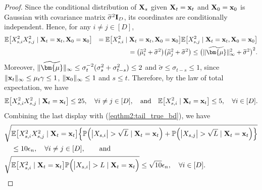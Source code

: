 \documentclass[11pt,a4paper,final]{article}
\numberwithin{equation}{section}
\theoremstyle{remark}
\newcommand{\bI}{{\bf I}}
\newcommand{\bx}{{\bf x}}
\newcommand{\bX}{{\bf X}}
\newcommand{\bbE}{{\mathbb E}}
\newcommand{\bbP}{{\mathbb P}}
\newcommand{\bmu}{\bm{\mu}}
\newcommand{\be}{\begin{equation}}
\newcommand{\ee}{\end{equation}}
\newcommand{\bean}{\setlength\arraycolsep{1pt}\begin{eqnarray*}}
\newcommand{\eean}{\end{eqnarray*}}
\begin{document}
\begin{proof}
Since the conditional distribution of $\bX_{s}$ given $\bX_{t} = \bx_t$ and $\bX_{0} = \bx_{0}$ is Gaussian with covariance matrix $\widetilde \sigma^2 \bI_{D}$, its coordinates are conditionally independent.
Hence, for any $i \neq j \in [D]$,
\bean
 \bbE \big[ X_{s,i}^2 X_{s,j}^2 \mid \bX_{t} = \bx_{t}, \bX_{0} = \bx_{0} \big]
 && =  \bbE \big[ X_{s,i}^2  \mid \bX_{t} = \bx_{t}, \bX_{0} = \bx_{0} \big]
  \bbE \big[  X_{s,j}^2 \mid \bX_{t} = \bx_{t}, \bX_{0} = \bx_{0} \big]
  \\
  && = \big( \widetilde \mu_{i}^2 + \widetilde \sigma^2 \big) \big( \widetilde \mu_{j}^2 + \widetilde \sigma^2 \big)
 \leq \big( \| \widetilde \bmu \|_{\infty}^2 + \widetilde \sigma^2 \big)^{2}.
\eean
Moreover, $\| \widetilde \bmu \|_{\infty}  \leq \sigma_{t}^{-2}(\sigma_{s}^2 + \sigma_{t-s}^2) \leq 2$ and $\widetilde \sigma \leq  \sigma_{t-s} \leq 1$, since $\| \bx_{t} \|_{\infty} \leq \mu_{t}\gamma \leq 1$, $\| \bx_{0} \|_{\infty} \leq 1$ and $ s \leq t$.
Therefore, by the law of total expectation, we have
\bean
 \bbE \big[ X_{s,i}^2 X_{s,j}^2 \mid \bX_{t} = \bx_{t} \big]
\leq 25, \quad \forall i \neq j \in [D],
\quad \text{and} \quad
 \bbE \big[ X_{s,i}^2 \mid \bX_{t} = \bx_{t} \big]
\leq 5, \quad \forall i \in [D].
\eean
Combining the last display with (\ref{eqthm2:tail_true_bd}), we have
\be
\begin{split}
 & \sqrt{ \bbE \big[ X_{s,i}^2 X_{s,j}^2 \mid \bX_{t} = \bx_{t} \big]  \Big\{  \bbP \Big(
\big\vert   X_{s,i}  \big\vert > \sqrt{L} \mid  \bX_{t} = \bx_{t} 
\Big)
+ \bbP \Big(
\big\vert   X_{s,j}  \big\vert > \sqrt{L} \mid  \bX_{t} = \bx_{t}
\Big) \Big\} } 
\\
&  \quad \leq 10 \epsilon_{n}, \quad \forall i \neq j \in [D], 
\qquad \text{and}
\\
& \sqrt{ \bbE \big[ X_{s,i}^2  \mid \bX_{t} = \bx_{t} \big]  \bbP \Big(
\big\vert   X_{s,i}  \big\vert > L \mid  \bX_{t} = \bx_{t} 
\Big) } 
\leq \sqrt{10} \epsilon_{n},
\quad \forall i \in [D].
\label{eqthm2:mom_true_bd}
\end{split}
\ee



\end{proof}
\end{document}

